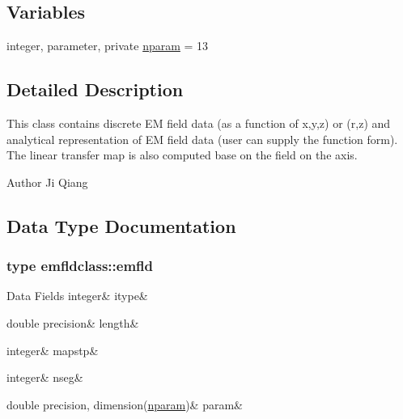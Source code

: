 \subsection*{Variables}
\begin{DoxyCompactItemize}
\item 
integer, parameter, private \mbox{\hyperlink{namespaceemfldclass_ad6fed90f4153b92a9a9ff35a6ef146c3}{nparam}} = 13
\end{DoxyCompactItemize}


\subsection{Detailed Description}
This class contains discrete EM field data (as a function of x,y,z) or (r,z) and analytical representation of EM field data (user can supply the function form). The linear transfer map is also computed base on the field on the axis. 

\begin{DoxyAuthor}{Author}
Ji Qiang 
\end{DoxyAuthor}


\subsection{Data Type Documentation}
\label{structemfldclass_1_1emfld}
\subsubsection{type emfldclass\+::emfld}
\begin{DoxyFields}{Data Fields}
\mbox{\label{namespaceemfldclass_aa9a88075072a030b64fd3878793b499b}} 
integer&
itype&
\\
\hline

\mbox{\label{namespaceemfldclass_a4938896636fb9fa907f15b621831cf97}} 
double precision&
length&
\\
\hline

\mbox{\label{namespaceemfldclass_ac18dfbe320fc1dc13393780eb0ae2613}} 
integer&
mapstp&
\\
\hline

\mbox{\label{namespaceemfldclass_a35f0c51ff70d545cef92bbbfa9546006}} 
integer&
nseg&
\\
\hline

\mbox{\label{namespaceemfldclass_ac4480d690e4e4d88d88ba939af8213cd}} 
double precision, dimension(\mbox{\hyperlink{namespaceemfldclass_ad6fed90f4153b92a9a9ff35a6ef146c3}{nparam}})&
param&
\\
\hline

\end{DoxyFields}


